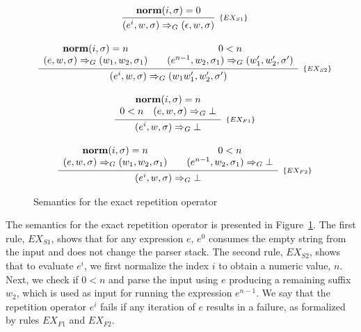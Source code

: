 \documentclass[preprint,12pt]{elsarticle}
\theoremstyle{definition}
\begin{document}
\begin{figure}[h!]
  \[
    \begin{array}{c}
      \infer[_{\{EX_{S1}\}}]
            {(e^i, w, \sigma)\Rightarrow_G (\epsilon,w,\sigma)}
            {\mathbf{norm}(i,\sigma) = 0} \\ \\
        \infer[_{\{EX_{S2}\}}]
              {(e^i,w,\sigma) \Rightarrow_G (w_1w'_1,w'_2,\sigma')}
              {\begin{array}{c}
                \mathbf{norm}(i,\sigma) = n \\
                (e,w,\sigma)\Rightarrow_G(w_1,w_2,\sigma_1)
               \end{array} &
               \begin{array}{c}
                 0 < n \\
                 (e^{n - 1},w_2,\sigma_1)\Rightarrow_G (w'_1,w'_2,\sigma')
               \end{array}}\\ \\
          \infer[_{\{EX_{F1}\}}]
                {(e^i,w,\sigma)\Rightarrow_G \bot}
                {\begin{array}{c}
                  \mathbf{norm}(i,\sigma) = n \\
                  0 < n \quad (e,w,\sigma)\Rightarrow_G \bot
                \end{array}} \\ \\
            \infer[_{\{EX_{F2}\}}]
                  {(e^i,w,\sigma) \Rightarrow_G \bot}
                  {\begin{array}{c}
                    \mathbf{norm}(i,\sigma) = n \\
                    (e,w,\sigma)\Rightarrow_G(w_1,w_2,\sigma_1)
                  \end{array} &
                  \begin{array}{c}
                    0 < n \\
                    (e^{n - 1},w_2,\sigma_1)\Rightarrow_G \bot
                  \end{array}}
    \end{array}
  \]
  \caption{Semantics for the exact repetition operator}
  \label{fig:exactsemantics}
\end{figure}

The semantics for the exact repetition operator is presented in
Figure~\ref{fig:exactsemantics}.
The first rule, $EX_{S1}$, shows that for any expression $e$, $e^0$ consumes the
empty string from the input and does not change the parser stack. The second rule,
$EX_{S2}$, shows that to evaluate $e^i$, we first normalize the index $i$ to obtain
a numeric value, $n$. Next, we check if $0 < n$ and parse the input using $e$ producing
a remaining suffix $w_2$, which is used as input for running the expression $e^{n - 1}$.
We say that the repetition operator $e^i$ fails if any iteration of $e$ results in a failure,
as formalized by rules $EX_{F1}$ and $EX_{F2}$.
\end{document}
